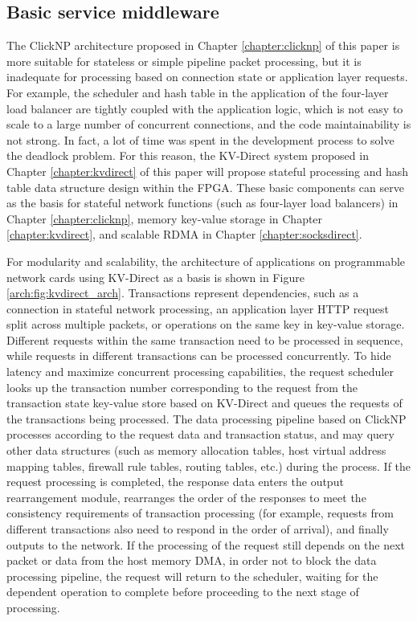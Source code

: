 \subsection{Basic service middleware}

The ClickNP architecture proposed in Chapter \ref{chapter:clicknp} of this paper is more suitable for stateless or simple pipeline packet processing, but it is inadequate for processing based on connection state or application layer requests.
For example, the scheduler and hash table in the application of the four-layer load balancer are tightly coupled with the application logic, which is not easy to scale to a large number of concurrent connections, and the code maintainability is not strong. In fact, a lot of time was spent in the development process to solve the deadlock problem.
For this reason, the KV-Direct system proposed in Chapter \ref{chapter:kvdirect} of this paper will propose stateful processing and hash table data structure design within the FPGA. These basic components can serve as the basis for stateful network functions (such as four-layer load balancers) in Chapter \ref{chapter:clicknp}, memory key-value storage in Chapter \ref{chapter:kvdirect}, and scalable RDMA in Chapter \ref{chapter:socksdirect}.


For modularity and scalability, the architecture of applications on programmable network cards using KV-Direct as a basis is shown in Figure \ref{arch:fig:kvdirect_arch}.
Transactions represent dependencies, such as a connection in stateful network processing, an application layer HTTP request split across multiple packets, or operations on the same key in key-value storage.
Different requests within the same transaction need to be processed in sequence, while requests in different transactions can be processed concurrently.
To hide latency and maximize concurrent processing capabilities, the request scheduler looks up the transaction number corresponding to the request from the transaction state key-value store based on KV-Direct and queues the requests of the transactions being processed.
The data processing pipeline based on ClickNP processes according to the request data and transaction status, and may query other data structures (such as memory allocation tables, host virtual address mapping tables, firewall rule tables, routing tables, etc.) during the process.
If the request processing is completed, the response data enters the output rearrangement module, rearranges the order of the responses to meet the consistency requirements of transaction processing (for example, requests from different transactions also need to respond in the order of arrival), and finally outputs to the network.
If the processing of the request still depends on the next packet or data from the host memory DMA, in order not to block the data processing pipeline, the request will return to the scheduler, waiting for the dependent operation to complete before proceeding to the next stage of processing.

